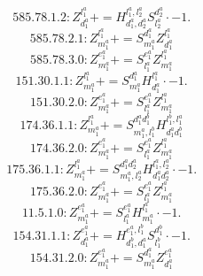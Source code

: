 \documentclass[letterpaper,10pt,fleqn,leqno,onecolumn]{article}
\begin{document}
\begin{equation} \;\;\;\;\;\;  585.78.1.2: Z^{l_{1}^{a}}_{d_{1}^{a}}+=H^{l_{1}^{a},l_{2}^{a}}_{d_{1}^{a},d_{2}^{a}}S^{d_{2}^{a}}_{l_{2}^{a}}\cdot -1. \end{equation}
\begin{equation} \;\;\;\;\;\;  585.78.2.1: Z^{l_{1}^{a}}_{m_{1}^{a}}+=S^{d_{1}^{a}}_{m_{1}^{a}}Z^{l_{1}^{a}}_{d_{1}^{a}} \end{equation}
\begin{equation} \;\;\;\;\;\;  585.78.3.0: Z^{e_{1}^{a}}_{m_{1}^{a}}+=S^{e_{1}^{a}}_{l_{1}^{a}}Z^{l_{1}^{a}}_{m_{1}^{a}} \end{equation}
\begin{equation} \;\;\;\;\;\;  151.30.1.1: Z^{l_{1}^{a}}_{m_{1}^{a}}+=S^{d_{1}^{a}}_{m_{1}^{a}}H^{l_{1}^{a}}_{d_{1}^{a}}\cdot -1. \end{equation}
\begin{equation} \;\;\;\;\;\;  151.30.2.0: Z^{e_{1}^{a}}_{m_{1}^{a}}+=S^{e_{1}^{a}}_{l_{1}^{a}}Z^{l_{1}^{a}}_{m_{1}^{a}} \end{equation}
\begin{equation} \;\;\;\;\;\;  174.36.1.1: Z^{l_{1}^{a}}_{m_{1}^{a}}+=S^{d_{1}^{a}d_{1}^{b}}_{m_{1}^{a},l_{1}^{b}}H^{l_{1}^{b},l_{1}^{a}}_{d_{1}^{a}d_{1}^{b}} \end{equation}
\begin{equation} \;\;\;\;\;\;  174.36.2.0: Z^{e_{1}^{a}}_{m_{1}^{a}}+=S^{e_{1}^{a}}_{l_{1}^{a}}Z^{l_{1}^{a}}_{m_{1}^{a}} \end{equation}
\begin{equation} \;\;\;\;\;\;  175.36.1.1: Z^{l_{1}^{a}}_{m_{1}^{a}}+=S^{d_{1}^{a}d_{2}^{a}}_{m_{1}^{a},l_{2}^{a}}H^{l_{1}^{a},l_{2}^{a}}_{d_{1}^{a}d_{2}^{a}}\cdot -1. \end{equation}
\begin{equation} \;\;\;\;\;\;  175.36.2.0: Z^{e_{1}^{a}}_{m_{1}^{a}}+=S^{e_{1}^{a}}_{l_{1}^{a}}Z^{l_{1}^{a}}_{m_{1}^{a}} \end{equation}
\begin{equation} \;\;\;\;\;\;  11.5.1.0: Z^{e_{1}^{a}}_{m_{1}^{a}}+=S^{e_{1}^{a}}_{l_{1}^{a}}H^{l_{1}^{a}}_{m_{1}^{a}}\cdot -1. \end{equation}
\begin{equation} \;\;\;\;\;\;  154.31.1.1: Z^{e_{1}^{a}}_{d_{1}^{a}}+=H^{e_{1}^{a},l_{1}^{b}}_{d_{1}^{b},d_{1}^{a}}S^{d_{1}^{b}}_{l_{1}^{b}}\cdot -1. \end{equation}
\begin{equation} \;\;\;\;\;\;  154.31.2.0: Z^{e_{1}^{a}}_{m_{1}^{a}}+=S^{d_{1}^{a}}_{m_{1}^{a}}Z^{e_{1}^{a}}_{d_{1}^{a}} \end{equation}
\end{document}
